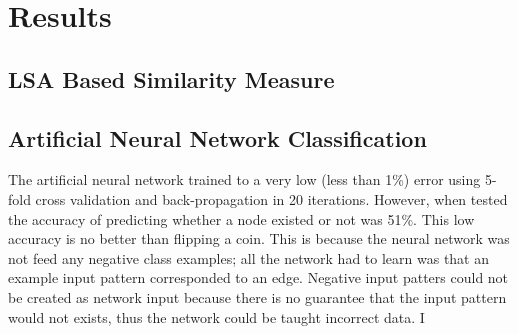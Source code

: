 \section{Results}
\label{sec:Results}

\subsection{LSA Based Similarity Measure}

\subsection{Artificial Neural Network Classification}

The artificial neural network trained to a very low (less than 1\%) error using 5-fold cross validation and back-propagation in 20 iterations. 
However, when tested the accuracy of predicting whether a node existed or not was 51\%.  This low accuracy is no better than flipping a coin.
This is because the neural network was not feed any negative class examples; all the network had to learn was that an example input pattern corresponded to an edge.
Negative input patters could not be created as network input because there is no guarantee that the input pattern would not exists, thus the network could be taught incorrect data.
I
